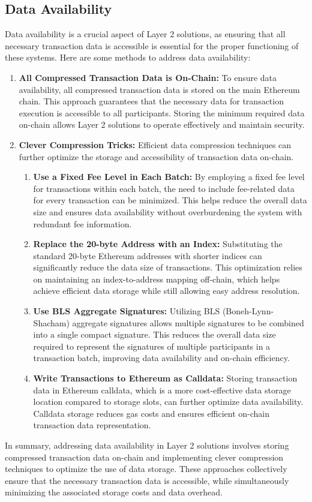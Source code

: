 \subsection{Data Availability}
Data availability is a crucial aspect of Layer 2 solutions, as ensuring that all necessary transaction data is accessible is essential for the proper functioning of these systems. Here are some methods to address data availability:
\begin{enumerate}
	\item \textbf{All Compressed Transaction Data is On-Chain:} To ensure data availability, all compressed transaction data is stored on the main Ethereum chain. This approach guarantees that the necessary data for transaction execution is accessible to all participants. Storing the minimum required data on-chain allows Layer 2 solutions to operate effectively and maintain security.
	\item \textbf{Clever Compression Tricks:} Efficient data compression techniques can further optimize the storage and accessibility of transaction data on-chain.
	\begin{enumerate}
		\item \textbf{Use a Fixed Fee Level in Each Batch:} By employing a fixed fee level for transactions within each batch, the need to include fee-related data for every transaction can be minimized. This helps reduce the overall data size and ensures data availability without overburdening the system with redundant fee information.
		\item \textbf{Replace the 20-byte Address with an Index:} Substituting the standard 20-byte Ethereum addresses with shorter indices can significantly reduce the data size of transactions. This optimization relies on maintaining an index-to-address mapping off-chain, which helps achieve efficient data storage while still allowing easy address resolution.
		\item \textbf{Use BLS Aggregate Signatures:} Utilizing BLS (Boneh-Lynn-Shacham) aggregate signatures allows multiple signatures to be combined into a single compact signature. This reduces the overall data size required to represent the signatures of multiple participants in a transaction batch, improving data availability and on-chain efficiency.
		\item \textbf{Write Transactions to Ethereum as Calldata:} Storing transaction data in Ethereum calldata, which is a more cost-effective data storage location compared to storage slots, can further optimize data availability. Calldata storage reduces gas costs and ensures efficient on-chain transaction data representation.
	\end{enumerate}
\end{enumerate}
In summary, addressing data availability in Layer 2 solutions involves storing compressed transaction data on-chain and implementing clever compression techniques to optimize the use of data storage. These approaches collectively ensure that the necessary transaction data is accessible, while simultaneously minimizing the associated storage costs and data overhead.

